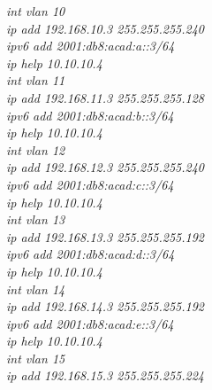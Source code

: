 \documentclass[12pt,a4paper]{report}
\begin{document}
\hspace*{2cm}\textit{int vlan 10\\
\hspace*{2cm}ip add 192.168.10.3 255.255.255.240\\
\hspace*{2cm}ipv6 add 2001:db8:acad:a::3/64\\
\hspace*{2cm}ip help 10.10.10.4\\
\hspace*{2cm}int vlan 11\\
\hspace*{2cm}ip add 192.168.11.3 255.255.255.128\\
\hspace*{2cm}ipv6 add 2001:db8:acad:b::3/64\\
\hspace*{2cm}ip help 10.10.10.4\\
\hspace*{2cm}int vlan 12\\
\hspace*{2cm}ip add 192.168.12.3 255.255.255.240\\
\hspace*{2cm}ipv6 add 2001:db8:acad:c::3/64\\
\hspace*{2cm}ip help 10.10.10.4\\
\hspace*{2cm}int vlan 13\\
\hspace*{2cm}ip add 192.168.13.3 255.255.255.192\\
\hspace*{2cm}ipv6 add 2001:db8:acad:d::3/64\\
\hspace*{2cm}ip help 10.10.10.4\\
\hspace*{2cm}int vlan 14\\
\hspace*{2cm}ip add 192.168.14.3 255.255.255.192\\
\hspace*{2cm}ipv6 add 2001:db8:acad:e::3/64\\
\hspace*{2cm}ip help 10.10.10.4\\
\hspace*{2cm}int vlan 15\\
\hspace*{2cm}ip add 192.168.15.3 255.255.255.224\\
}
\end{document}
